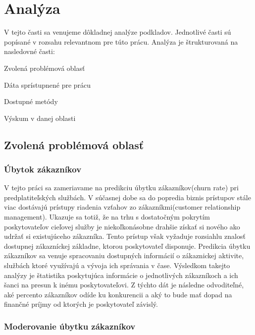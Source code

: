 \newpage
\chapter{Analýza}
\label{ch:Analýza}
V tejto časti sa venujeme dôkladnej analýze podkladov. Jednotlivé časti sú popísané v rozsahu relevantnom pre túto prácu. Analýza je štrukturovaná na nasledovné časti:

\begin{my_itemize}
	\item {Zvolená problémová oblasť}
	\item {Dáta sprístupnené pre prácu}
	\item {Dostupné metódy}
	\item {Výskum v danej oblasti}
\end{my_itemize}

\section{Zvolená problémová oblasť}
\label{problemova_oblast}

\subsection{Úbytok zákazníkov}
\label{ubytok_zakaznikov}
V tejto práci sa zameriavame na predikciu úbytku zákazníkov(churn rate) pri predplatiteľských službách. V súčasnej dobe sa do popredia biznis prístupov stále viac dostávajú prístupy riadenia vzťahov zo zákazníkmi(customer relationship management). Ukazuje sa totiž, že na trhu s dostatočným pokrytím poskytovateľov cieľovej služby je niekoľkonásobne drahšie získať si nového ako udržať si existujúceho zákazníka. Tento prístup však vyžaduje rozsiahlu znalosť dostupnej zákazníckej základne, ktorou poskytovateľ disponuje. \newline
Predikcia úbytku zákazníkov sa venuje spracovaniu dostupných informácií o zákaznickej aktivite, službách ktoré využívajú a vývoja ich správania v čase. Výsledkom takejto analýzy je štatistika poskytujúca informácie o jednotlivých zákazníkoch a ich šanci na presun k inému poskytovateľovi. Z týchto dát je následne odvoditeľné, aké percento zákazníkov odíde ku konkurencii a aký to bude mať dopad na finančné príjmy od ktorých je poskytovateľ závislý. 

\subsection{Moderovanie úbytku zákazníkov}

